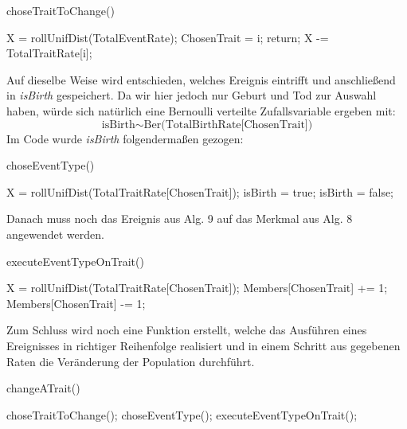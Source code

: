\documentclass[11pt, a4paper, german]{article}
\theoremstyle{plain}
\begin{document}
	\begin{algorithm}[H]
 		\caption{choseTraitToChange()}
 		\begin{algorithmic}[1]
 			\State X = rollUnifDist(TotalEventRate);
 					\State ChosenTrait = i;
 					\State return;
 				\EndIf
 				\State X -= TotalTraitRate[i];
 			\EndFor
 		\end{algorithmic}
 	\end{algorithm}
 	Auf dieselbe Weise wird entschieden, welches Ereignis eintrifft und anschließend in \textit{isBirth} gespeichert. Da wir hier jedoch nur Geburt und Tod zur Auswahl haben, würde sich natürlich eine Bernoulli verteilte Zufallsvariable ergeben mit:
 	\[ \text{isBirth} \sim \text{Ber(TotalBirthRate[ChosenTrait])} \]
 	Im Code wurde \textit{isBirth} folgendermaßen gezogen:
	\begin{algorithm}[H]
 		\caption{choseEventType()}
 		\begin{algorithmic}[1]
 			\State X = rollUnifDist(TotalTraitRate[ChosenTrait]);
 				\State isBirth = true;
 			\Else
 				\State isBirth = false;
 			\EndIf
 		\end{algorithmic}
 	\end{algorithm}
 	Danach muss noch das Ereignis aus Alg. 9 auf das Merkmal aus Alg. 8 angewendet werden.
	\begin{algorithm}[H]
 		\caption{executeEventTypeOnTrait()}
 		\begin{algorithmic}[1]
 			\State X = rollUnifDist(TotalTraitRate[ChosenTrait]);
 				\State Members[ChosenTrait] += 1;
 			\EndIf
 				\State Members[ChosenTrait] -= 1;
 			\EndIf
 		\end{algorithmic}
 	\end{algorithm} 	
 	Zum Schluss wird noch eine Funktion erstellt, welche das Ausführen eines Ereignisses in richtiger Reihenfolge realisiert und in einem Schritt aus gegebenen Raten die Veränderung der Population durchführt.
 	\begin{algorithm}[H]
 		\caption{changeATrait()}
 		\begin{algorithmic}[1]
 			\State choseTraitToChange();
 			\State choseEventType();
 			\State executeEventTypeOnTrait();
 		\end{algorithmic}
 	\end{algorithm} 
\end{document}
